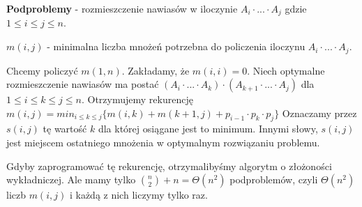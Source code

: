 \textbf{Podproblemy} - rozmieszczenie nawiasów w iloczynie $A_i \cdot ... \cdot A_j$ gdzie $1 \leq i \leq j \leq n$. 

$m(i,j)$ - minimalna liczba mnożeń potrzebna do policzenia iloczynu $A_i \cdot ... \cdot A_j$.

Chcemy policzyć $m(1,n)$. Zakładamy, że $m(i,i) = 0$. Niech optymalne rozmieszczenie nawiasów ma postać $(A_i \cdot ... \cdot A_k) \cdot (A_{k+1} \cdot ... \cdot A_j)$ dla $1 \leq  i \leq k \leq j \leq n$. 
Otrzymujemy rekurencję $m(i,j) = min_{i \leq k \leq j} \{ m(i,k) +m(k+1,j) + p_{i-1} \cdot p_k \cdot p_j \}$ Oznaczamy przez $s(i,j)$ tę wartość $k$ dla której osiągane jest to minimum. Innymi słowy, $s(i,j)$ jest miejscem ostatniego mnożenia w optymalnym rozwiązaniu problemu. 

Gdyby zaprogramować tę rekurencję, otrzymalibyśmy algorytm o złożoności wykładniczej. Ale mamy tylko $\binom{n}{2} + n = \Theta(n^2)$ podproblemów, czyli $\Theta(n^2)$ liczb $m(i,j)$ i każdą z nich liczymy tylko raz.